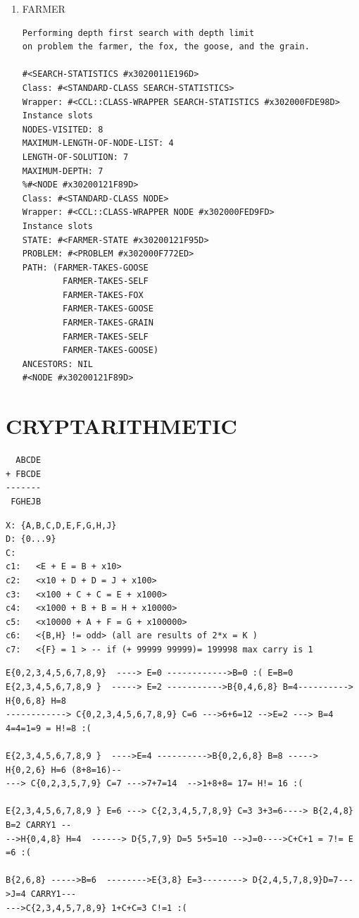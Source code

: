 \documentclass[a4paper,6pt]{article}
\begin{document}
\begin{enumerate}
\begin{enumerate}
\item FARMER
\label{sec-1-2-3-3}
\begin{verbatim}
Performing depth first search with depth limit 
on problem the farmer, the fox, the goose, and the grain.

#<SEARCH-STATISTICS #x3020011E196D>
Class: #<STANDARD-CLASS SEARCH-STATISTICS>
Wrapper: #<CCL::CLASS-WRAPPER SEARCH-STATISTICS #x302000FDE98D>
Instance slots
NODES-VISITED: 8
MAXIMUM-LENGTH-OF-NODE-LIST: 4
LENGTH-OF-SOLUTION: 7
MAXIMUM-DEPTH: 7
%#<NODE #x30200121F89D>
Class: #<STANDARD-CLASS NODE>
Wrapper: #<CCL::CLASS-WRAPPER NODE #x302000FED9FD>
Instance slots
STATE: #<FARMER-STATE #x30200121F95D>
PROBLEM: #<PROBLEM #x302000F772ED>
PATH: (FARMER-TAKES-GOOSE
        FARMER-TAKES-SELF
        FARMER-TAKES-FOX
        FARMER-TAKES-GOOSE
        FARMER-TAKES-GRAIN
        FARMER-TAKES-SELF
        FARMER-TAKES-GOOSE)
ANCESTORS: NIL
#<NODE #x30200121F89D>
\end{verbatim}
\end{enumerate}
\end{enumerate}
\section{CRYPTARITHMETIC}
\label{sec-2}
\begin{verbatim}
  ABCDE
+ FBCDE
-------
 FGHEJB
\end{verbatim}
\begin{verbatim}
X: {A,B,C,D,E,F,G,H,J}
D: {0...9}
C: 
c1:   <E + E = B + x10>
c2:   <x10 + D + D = J + x100>
c3:   <x100 + C + C = E + x1000>
c4:   <x1000 + B + B = H + x10000>
c5:   <x10000 + A + F = G + x100000>
c6:   <{B,H} != odd> (all are results of 2*x = K )
c7:   <{F} = 1 > -- if (+ 99999 99999)= 199998 max carry is 1
\end{verbatim}

\begin{verbatim}
E{0,2,3,4,5,6,7,8,9}  ----> E=0 ------------>B=0 :( E=B=0 
E{2,3,4,5,6,7,8,9 }  -----> E=2 ----------->B{0,4,6,8} B=4----------> H{0,6,8} H=8
------------> C{0,2,3,4,5,6,7,8,9} C=6 --->6+6=12 -->E=2 ---> B=4 4=4=1=9 = H!=8 :(

E{2,3,4,5,6,7,8,9 }  ---->E=4 ---------->B{0,2,6,8} B=8 -----> H{0,2,6} H=6 (8+8=16)--
---> C{0,2,3,5,7,9} C=7 --->7+7=14  -->1+8+8= 17= H!= 16 :(

E{2,3,4,5,6,7,8,9 } E=6 ---> C{2,3,4,5,7,8,9} C=3 3+3=6----> B{2,4,8} B=2 CARRY1 --
-->H{0,4,8} H=4  ------> D{5,7,9} D=5 5+5=10 -->J=0---->C+C+1 = 7!= E =6 :(

B{2,6,8} ----->B=6  -------->E{3,8} E=3--------> D{2,4,5,7,8,9}D=7--->J=4 CARRY1---
--->C{2,3,4,5,7,8,9} 1+C+C=3 C!=1 :(
\end{verbatim}
\end{document}
